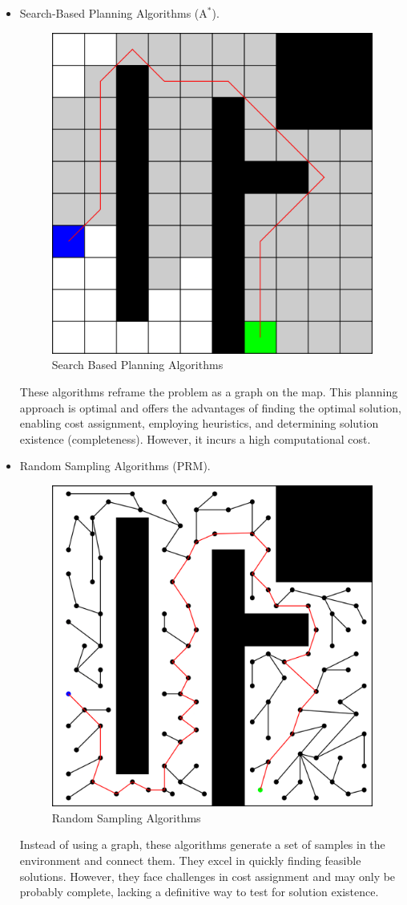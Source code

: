 \begin{itemize}
    \item Search-Based Planning Algorithms ($\text{A}^\ast$). 
        \begin{figure}[H]
            \centering
            \includegraphics[width=0.45\linewidth]{images/sb.png}
            \caption{Search Based Planning Algorithms}
        \end{figure}
        These algorithms reframe the problem as a graph on the map. 
        This planning approach is optimal and offers the advantages of finding the optimal solution, enabling cost assignment, employing heuristics, and determining solution existence (completeness). 
        However, it incurs a high computational cost.
    \item Random Sampling Algorithms (PRM). 
        \begin{figure}[H]
            \centering
            \includegraphics[width=0.45\linewidth]{images/sb1.png}
            \caption{Random Sampling Algorithms}
        \end{figure}
        Instead of using a graph, these algorithms generate a set of samples in the environment and connect them. 
        They excel in quickly finding feasible solutions.
        However, they face challenges in cost assignment and may only be probably complete, lacking a definitive way to test for solution existence.
\end{itemize}